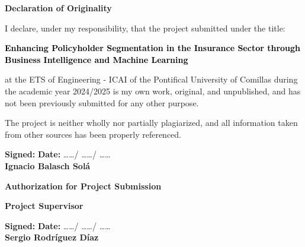 \begin{center}
    {\large \textbf{Declaration of Originality}} \vspace{2cm}
\end{center}

I declare, under my responsibility, that the project submitted under the title:  

\begin{center}
    \textbf{\textcolor{black}{Enhancing Policyholder Segmentation in the Insurance Sector through Business Intelligence and Machine Learning}}  
\end{center}

at the ETS of Engineering - ICAI of the Pontifical University of Comillas during the academic year 2024/2025 is my own work, original, and unpublished, and has not been previously submitted for any other purpose.  

The project is neither wholly nor partially plagiarized, and all information taken from other sources has been properly referenced.  

\vspace{2cm}

\noindent
\textbf{Signed:} \hfill \textbf{Date:} ……/ ……/ ……  \\
\textbf{Ignacio Balasch Solá}  

\vspace{2cm}

\noindent
\textbf{Authorization for Project Submission}  

\noindent
\textbf{Project Supervisor}  

\vspace{1cm}

\noindent
\textbf{Signed:} \hfill \textbf{Date:} ……/ ……/ ……  \\
\textbf{Sergio Rodríguez Díaz}  

